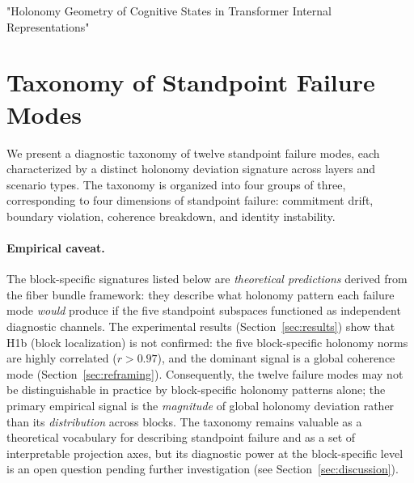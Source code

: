 "Holonomy Geometry of Cognitive States in Transformer Internal Representations"

\section{Taxonomy of Standpoint Failure Modes}
\label{sec:taxonomy}

We present a diagnostic taxonomy of twelve standpoint failure modes, each characterized
by a distinct holonomy deviation signature across layers and scenario types. The taxonomy
is organized into four groups of three, corresponding to four dimensions of standpoint
failure: commitment drift, boundary violation, coherence breakdown, and identity
instability.

\paragraph{Empirical caveat.}
The block-specific signatures listed below are \emph{theoretical predictions} derived
from the fiber bundle framework: they describe what holonomy pattern each failure mode
\emph{would} produce if the five standpoint subspaces functioned as independent
diagnostic channels. The experimental results (Section~\ref{sec:results}) show that H1b
(block localization) is not confirmed: the five block-specific holonomy norms are
highly correlated ($r > 0.97$), and the dominant signal is a global coherence mode
(Section~\ref{sec:reframing}). Consequently, the twelve failure modes may not be
distinguishable in practice by block-specific holonomy patterns alone; the primary
empirical signal is the \emph{magnitude} of global holonomy deviation rather than its
\emph{distribution} across blocks. The taxonomy remains valuable as a theoretical
vocabulary for describing standpoint failure and as a set of interpretable projection
axes, but its diagnostic power at the block-specific level is an open question pending
further investigation (see Section~\ref{sec:discussion}).

